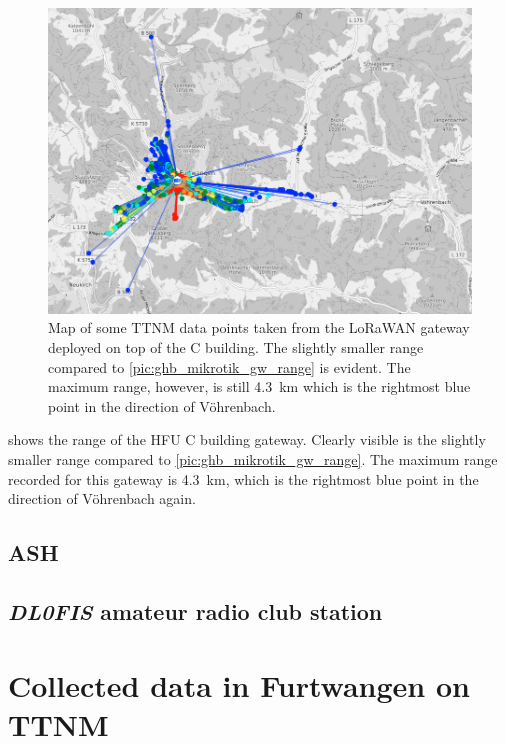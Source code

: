 \begin{figure}
    \centering
    \includegraphics[width=1\textwidth]{pictures/ttn-mapper/gateway-ranges/c_building_gw_range.png}
    \caption{
        Map of some \ac{TTNM} data points taken from the \ac{LoRaWAN} gateway deployed on top of the C building.
        The slightly smaller range compared to \cref{pic:ghb_mikrotik_gw_range} is evident.
        The maximum range, however, is still \SI{4.3}{\kilo\meter} which is the rightmost blue point in the direction of Vöhrenbach.
    }\label{pic:c_building_gw_range}
\end{figure}

 shows the range of the \ac{HFU} C building gateway.
Clearly visible is the slightly smaller range compared to \cref{pic:ghb_mikrotik_gw_range}.
The maximum range recorded for this gateway is \SI{4.3}{\kilo\meter}, which is the rightmost blue point in the direction of Vöhrenbach again.

\subsection{\acf{ASH}}


\subsection{\emph{DL0FIS} amateur radio club station}


\section{Collected data in Furtwangen on \acl{TTNM}}\label{sec:collected-data-in-furtwangen-on-ttnm}

